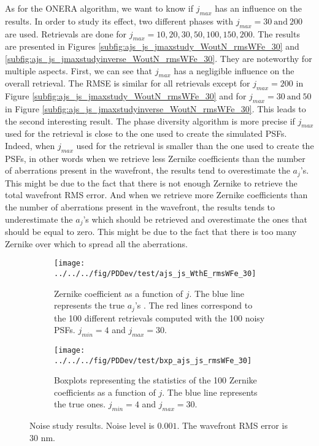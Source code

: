 As for the ONERA algorithm, we want to know if $j_{max}$ has an influence on the results. In order to study its effect, two different phases with $j_{max} = 30 \ \mathrm{and} \ 200$ are used. Retrievals are done for $j_{max} = 10, 20 , 30, 50,100,150,200$. The results are presented in Figures \ref{subfig:ajs_js_jmaxstudy_WoutN_rmsWFe_30} and \ref{subfig:ajs_js_jmaxstudyinverse_WoutN_rmsWFe_30}. They are noteworthy for multiple aspects. First, we can see that $j_{max}$ has a negligible influence on the overall retrieval. The RMSE is similar for all retrievals except for $j_{max}=200$ in Figure \ref{subfig:ajs_js_jmaxstudy_WoutN_rmsWFe_30} and for $j_{max} = 30 \ \mathrm{and} \ 50$ in Figure \ref{subfig:ajs_js_jmaxstudyinverse_WoutN_rmsWFe_30}. This leads to the second interesting result. The phase diversity algorithm is more precise if $j_{max}$ used for the retrieval is close to the one used to create the simulated PSFs. Indeed, when $j_{max}$ used for the retrieval is smaller than the one used to create the PSFs, in other words when we retrieve less Zernike coefficients than the number of aberrations present in the wavefront, the results tend to overestimate the $a_j$'s. This might be due to the fact that there is not enough Zernike to retrieve the total wavefront RMS error. And when we retrieve more Zernike coefficients than the number of aberrations present in the wavefront, the results tends to underestimate the $a_j$'s which should be retrieved and overestimate the ones that should be equal to zero. This might be due to the fact that there is too many Zernike over which to spread all the aberrations.

\begin{figure}
\centering
    \begin{subfigure}{0.45\textwidth}
        \texttt{[image: ../../../fig/PDDev/test/ajs\_js\_WthE\_rmsWFe\_30]}
        \caption{Zernike coefficient as a function of $j$.  The blue line represents the true $a_j$'s . The red lines correspond to the 100 different retrievals computed with the 100 noisy PSFs. $j_{min}=4$ and $j_{max}=30$.}
        \label{subfig:ajs_js_WthE_rmsWFe_30}
    \end{subfigure}
    \quad
    \begin{subfigure}{0.45\textwidth}
        \texttt{[image: ../../../fig/PDDev/test/bxp\_ajs\_js\_rmsWFe\_30]}
        \caption{Boxplots representing the statistics of the 100 Zernike coefficients as a function of $j$. The blue line represents the true ones. $j_{min}=4$ and $j_{max}=30$.}
        \label{subfig:bxp_ajs_js_rmsWFe_30}
    \end{subfigure}
    \decoRule
    \caption{Noise study results. Noise level is $0.001$. The wavefront RMS error is 30 nm.}
\end{figure}

